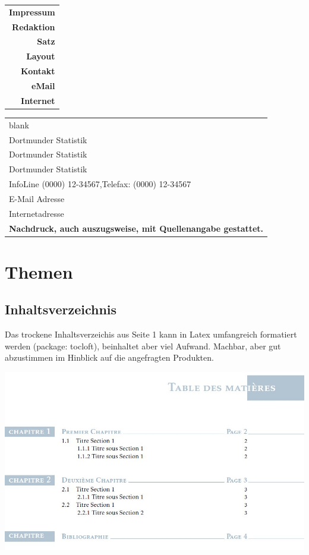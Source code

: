 \documentclass[
  a4paper,
  twoside]{article}
\begin{document}
\begin{tabular}[b]{@{}r}
\textcolor{DoStat}{\textbf{Impressum}} \\
\hspace{4cm}\textbf{Redaktion} \\
\hspace{4cm}\textbf{Satz} \\
\hspace{4cm}\textbf{Layout} \\
\hspace{4cm}\textbf{Kontakt} \\
\hspace{4cm}\textbf{eMail} \\
\hspace{4cm}\textbf{Internet} \\
\end{tabular}
\hfill
\begin{tabular}[b]{l@{}}
blank \\
Dortmunder Statistik \\
Dortmunder Statistik \\
Dortmunder Statistik \\
InfoLine (0000) 12-34567,Telefax: (0000) 12-34567 \\
E-Mail Adresse \\
Internetadresse \\
\textcolor{DoStat}{\textbf{Nachdruck, auch auszugsweise, mit Quellenangabe gestattet.}} \\
\end{tabular}

\newpage

\hypertarget{themen}{%
\section{Themen}\label{themen}}

\hypertarget{inhaltsverzeichnis}{%
\subsection*{Inhaltsverzeichnis}\label{inhaltsverzeichnis}}

Das trockene Inhaltsverzeichis aus Seite 1 kann in Latex umfangreich
formatiert werden (package: tocloft), beinhaltet aber viel Aufwand.
Machbar, aber gut abzustimmen im Hinblick auf die angefragten Produkten.

\includegraphics{B8obV.jpg}
\end{document}
